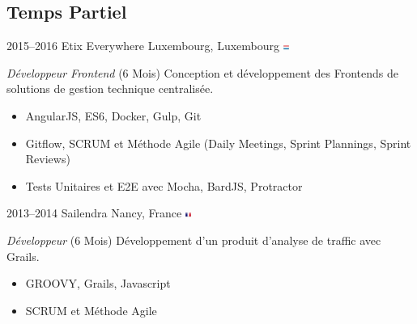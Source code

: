 \documentclass[]{friggeri-cv} %
\begin{document}
\subsection{Temps Partiel}
\begin{entrylist}
\entry
{2015--2016}
{Etix Everywhere}
{Luxembourg, Luxembourg {\includegraphics[height=0.2cm]{./flags/lu.png}}}
{\emph{Développeur Frontend} (6 Mois)\newline
Conception et développement des Frontends de solutions de gestion technique centralisée.
\begin{itemize}
\item AngularJS, ES6, Docker, Gulp, Git
\item Gitflow, SCRUM et Méthode Agile (Daily Meetings, Sprint Plannings, Sprint Reviews)
\item Tests Unitaires et E2E avec Mocha, BardJS, Protractor
\end{itemize}}
\entry
{2013--2014}
{Sailendra}
{Nancy, France {\includegraphics[height=0.2cm]{./flags/fr.png}}}
{\textit{Développeur} (6 Mois)\newline
Développement d'un produit d'analyse de traffic avec Grails.
\begin{itemize}
\item GROOVY, Grails, Javascript
\item SCRUM et Méthode Agile
\end{itemize}}
\end{entrylist}
\end{document}
